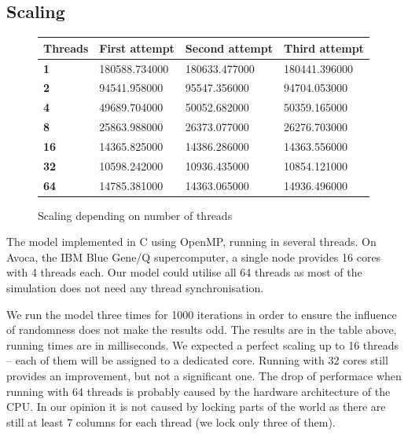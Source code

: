 \documentclass[a4paper]{article}
\begin{document}
\subsection{Scaling}

\begin{figure}[ht]
    \centering
    \begin{tabu} {| X[0.8,c,p] || X[1,c,p] | X[1,c,p] | X[1,c,p] |}
        \rowfont{\bfseries}
        \hline
        Threads &
        First attempt &
        Second attempt&
        Third attempt \\
        \hline
        \hline
        \textbf{1} & 180588.734000 & 180633.477000 & 180441.396000 \\
        \hline
        \textbf{2} & 94541.958000 & 95547.356000 & 94704.053000 \\
        \hline
        \textbf{4} & 49689.704000 & 50052.682000 & 50359.165000 \\
        \hline
        \textbf{8} & 25863.988000 & 26373.077000 & 26276.703000 \\
        \hline
        \textbf{16} & 14365.825000 & 14386.286000 & 14363.556000 \\
        \hline
        \textbf{32} & 10598.242000 & 10936.435000 & 10854.121000 \\
        \hline
        \textbf{64} & 14785.381000 & 14363.065000 & 14936.496000 \\
        \hline
    \end{tabu}
    \caption{Scaling depending on number of threads}
\end{figure}

The model implemented in C using OpenMP, running in several threads.
On Avoca, the IBM Blue Gene/Q supercomputer, a single node provides 16 cores with 4 threads each.
Our model could utilise all 64 threads as most of the simulation does not need any thread synchronisation.

We run the model three times for 1000 iterations in order to ensure the influence of randomness does not make the results odd.
The results are in the table above, running times are in milliseconds.
We expected a perfect scaling up to 16 threads -- each of them will be assigned to a dedicated core.
Running with 32 cores still provides an improvement, but not a significant one.
The drop of performace when running with 64 threads is probably caused by the hardware architecture of the CPU.
In our opinion it is not caused by locking parts of the world as there are still at least 7 columns for each thread (we lock only three of them).
\end{document}
